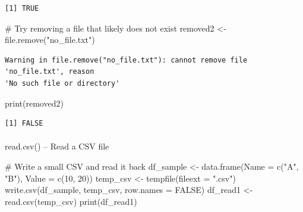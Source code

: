 \documentclass[
  letterpaper,
  DIV=11,
  numbers=noendperiod]{scrartcl}
\makeatletter
\let\oldparagraph\paragraph
\renewcommand{\paragraph}{
    \@ifstar
      \xxxParagraphStar
      \xxxParagraphNoStar
  }
\newcommand{\xxxParagraphStar}[1]{\oldparagraph*{#1}\mbox{}}
\newcommand{\xxxParagraphNoStar}[1]{\oldparagraph{#1}\mbox{}}
\newenvironment{Shaded}{\begin{snugshade}}{\end{snugshade}}
\newcommand{\AttributeTok}[1]{\textcolor[rgb]{0.40,0.45,0.13}{#1}}
\newcommand{\CommentTok}[1]{\textcolor[rgb]{0.37,0.37,0.37}{#1}}
\newcommand{\ConstantTok}[1]{\textcolor[rgb]{0.56,0.35,0.01}{#1}}
\newcommand{\DecValTok}[1]{\textcolor[rgb]{0.68,0.00,0.00}{#1}}
\newcommand{\FunctionTok}[1]{\textcolor[rgb]{0.28,0.35,0.67}{#1}}
\newcommand{\NormalTok}[1]{\textcolor[rgb]{0.00,0.23,0.31}{#1}}
\newcommand{\OtherTok}[1]{\textcolor[rgb]{0.00,0.23,0.31}{#1}}
\newcommand{\StringTok}[1]{\textcolor[rgb]{0.13,0.47,0.30}{#1}}
\makeatother
\begin{document}
\begin{verbatim}
[1] TRUE
\end{verbatim}

\begin{Shaded}
\begin{Highlighting}[]
\CommentTok{\#   Try removing a file that likely does not exist}
\NormalTok{removed2 }\OtherTok{\textless{}{-}} \FunctionTok{file.remove}\NormalTok{(}\StringTok{"no\_file.txt"}\NormalTok{)}
\end{Highlighting}
\end{Shaded}

\begin{verbatim}
Warning in file.remove("no_file.txt"): cannot remove file 'no_file.txt', reason
'No such file or directory'
\end{verbatim}

\begin{Shaded}
\begin{Highlighting}[]
\FunctionTok{print}\NormalTok{(removed2)}
\end{Highlighting}
\end{Shaded}

\begin{verbatim}
[1] FALSE
\end{verbatim}

\paragraph{read.csv() -- Read a CSV
file}\label{read.csv-read-a-csv-file}

\begin{Shaded}
\begin{Highlighting}[]
\CommentTok{\#   Write a small CSV and read it back}
\NormalTok{df\_sample }\OtherTok{\textless{}{-}} \FunctionTok{data.frame}\NormalTok{(}\AttributeTok{Name =} \FunctionTok{c}\NormalTok{(}\StringTok{"A"}\NormalTok{, }\StringTok{"B"}\NormalTok{), }\AttributeTok{Value =} \FunctionTok{c}\NormalTok{(}\DecValTok{10}\NormalTok{, }\DecValTok{20}\NormalTok{))}
\NormalTok{temp\_csv }\OtherTok{\textless{}{-}} \FunctionTok{tempfile}\NormalTok{(}\AttributeTok{fileext =} \StringTok{".csv"}\NormalTok{)}
\FunctionTok{write.csv}\NormalTok{(df\_sample, temp\_csv, }\AttributeTok{row.names =} \ConstantTok{FALSE}\NormalTok{)}
\NormalTok{df\_read1 }\OtherTok{\textless{}{-}} \FunctionTok{read.csv}\NormalTok{(temp\_csv)}
\FunctionTok{print}\NormalTok{(df\_read1)}
\end{Highlighting}
\end{Shaded}
\end{document}
